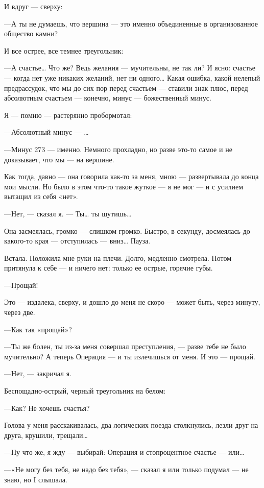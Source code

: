 \documentclass[11pt,openany]{book}
\begin{document}
И вдруг --- сверху:

---А ты не думаешь, что вершина --- это именно объединенные в организованное общество камни?

И все острее, все темнее треугольник:

---А счастье\ldots{} Что же? Ведь желания --- мучительны, не так ли? И ясно: счастье --- когда нет уже никаких желаний, нет ни одного\ldots{} Какая ошибка, какой нелепый предрассудок, что мы до сих пор перед счастьем --- ставили знак плюс, перед абсолютным счастьем --- конечно, минус --- божественный минус.

Я --- помню --- растерянно пробормотал:

---Абсолютный минус --- \ldots{}

---Минус 273 --- именно. Немного прохладно, но разве это-то самое и не доказывает, что мы --- на вершине.

Как тогда, давно --- она говорила как-то за меня, мною --- развертывала до конца мои мысли. Но было в этом что-то такое жуткое --- я не мог --- и с усилием вытащил из себя «нет».

---Нет, --- сказал я. --- Ты\ldots{} ты шутишь\ldots{}

Она засмеялась, громко --- слишком громко. Быстро, в секунду, досмеялась до какого-то края --- отступилась --- вниз\ldots{} Пауза.

Встала. Положила мне руки на плечи. Долго, медленно смотрела. Потом притянула к себе --- и ничего нет: только ее острые, горячие губы.

---Прощай!

Это --- издалека, сверху, и дошло до меня не скоро --- может быть, через минуту, через две.

---Как так «прощай»?

---Ты же болен, ты из-за меня совершал преступления, --- разве тебе не было мучительно? А теперь Операция --- и ты излечишься от меня. И это --- прощай.

---Нет, --- закричал я.

Беспощадно-острый, черный треугольник на белом:

---Как? Не хочешь счастья?

Голова у меня расскакивалась, два логических поезда столкнулись, лезли друг на друга, крушили, трещали\ldots{}

---Ну что же, я жду --- выбирай: Операция и стопроцентное счастье --- или\ldots{}

---«Не могу без тебя, не надо без тебя», --- сказал я или только подумал --- не знаю, но I слышала.
\end{document}
